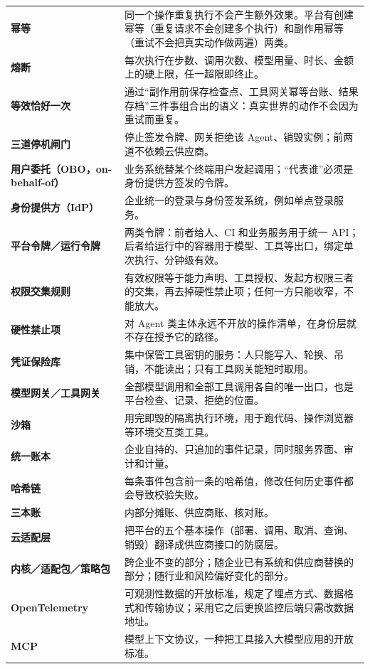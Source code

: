 \begin{longtable}{@{}>{\bfseries}L{3.4cm}L{\dimexpr\textwidth-3.4cm-2\tabcolsep\relax}@{}}
  幂等 & 同一个操作重复执行不会产生额外效果。平台有创建幂等（重复请求不会创建多个执行）和副作用幂等（重试不会把真实动作做两遍）两类。\\
  熔断 & 每次执行在步数、调用次数、模型用量、时长、金额上的硬上限，任一超限即终止。\\
  等效恰好一次 & 通过“副作用前保存检查点、工具网关幂等台账、结果存档”三件事组合出的语义：真实世界的动作不会因为重试而重复。\\
  三道停机闸门 & 停止签发令牌、网关拒绝该 Agent、销毁实例；前两道不依赖云供应商。\\
  用户委托（OBO，on-behalf-of） & 业务系统替某个终端用户发起调用；“代表谁”必须是身份提供方签发的令牌。\\
  身份提供方（IdP） & 企业统一的登录与身份签发系统，例如单点登录服务。\\
  平台令牌／运行令牌 & 两类令牌：前者给人、CI 和业务服务用于统一 API；后者给运行中的容器用于模型、工具等出口，绑定单次执行、分钟级有效。\\
  权限交集规则 & 有效权限等于能力声明、工具授权、发起方权限三者的交集，再去掉硬性禁止项；任何一方只能收窄，不能放大。\\
  硬性禁止项 & 对 Agent 类主体永远不开放的操作清单，在身份层就不存在授予它的路径。\\
  凭证保险库 & 集中保管工具密钥的服务：人只能写入、轮换、吊销，不能读出；只有工具网关能短时取用。\\
  模型网关／工具网关 & 全部模型调用和全部工具调用各自的唯一出口，也是平台检查、记录、拒绝的位置。\\
  沙箱 & 用完即毁的隔离执行环境，用于跑代码、操作浏览器等环境交互类工具。\\
  统一账本 & 企业自持的、只追加的事件记录，同时服务界面、审计和计量。\\
  哈希链 & 每条事件包含前一条的哈希值，修改任何历史事件都会导致校验失败。\\
  三本账 & 内部分摊账、供应商账、核对账。\\
  云适配层 & 把平台的五个基本操作（部署、调用、取消、查询、销毁）翻译成供应商接口的防腐层。\\
  内核／适配包／策略包 & 跨企业不变的部分；随企业已有系统和供应商替换的部分；随行业和风险偏好变化的部分。\\
  OpenTelemetry & 可观测性数据的开放标准，规定了埋点方式、数据格式和传输协议；采用它之后更换监控后端只需改数据地址。\\
  MCP & 模型上下文协议，一种把工具接入大模型应用的开放标准。\\
  \bottomrule
\end{longtable}

